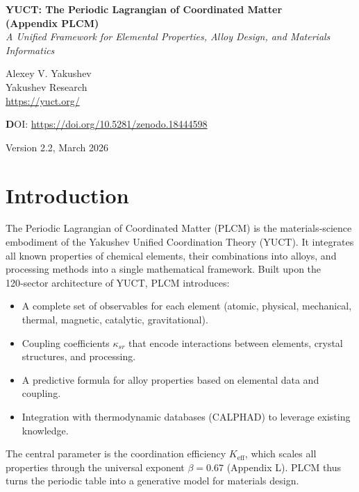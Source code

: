\documentclass[12pt,a4paper]{article}
\newcommand{\Keff}{K_{\mathrm{eff}}}
\newcommand{\be}{\beta}
\begin{document}
	
	\begin{titlepage}
		\centering
		\vspace*{1cm}
		\Huge\textbf{YUCT: The Periodic Lagrangian of Coordinated Matter} \\
		\vspace{0.3cm}
		\Large\textbf{(Appendix PLCM)} \\
		\vspace{0.5cm}
		\large\textit{A Unified Framework for Elemental Properties, Alloy Design, and Materials Informatics}
		\vspace{2cm}
		
		\Large Alexey V. Yakushev \\
		\large Yakushev Research \\
		\url{https://yuct.org/}
		\vspace{2cm}
		
		\vspace{2cm}
		\textbf DOI: \url{https://doi.org/10.5281/zenodo.18444598}\\
		
		\vspace{1cm}
		
		\large Version 2.2, March 2026
		\vfill
	\end{titlepage}
	
	\tableofcontents
	\newpage
	
	\section{Introduction}
	
	The Periodic Lagrangian of Coordinated Matter (PLCM) is the materials‑science embodiment of the Yakushev Unified Coordination Theory (YUCT). It integrates all known properties of chemical elements, their combinations into alloys, and processing methods into a single mathematical framework. Built upon the 120‑sector architecture of YUCT, PLCM introduces:
	\begin{itemize}
		\item A complete set of observables for each element (atomic, physical, mechanical, thermal, magnetic, catalytic, gravitational).
		\item Coupling coefficients \(\kappa_{sr}\) that encode interactions between elements, crystal structures, and processing.
		\item A predictive formula for alloy properties based on elemental data and coupling.
		\item Integration with thermodynamic databases (CALPHAD) to leverage existing knowledge.
	\end{itemize}
	The central parameter is the coordination efficiency \(\Keff\), which scales all properties through the universal exponent \(\be = 0.67\) (Appendix L). PLCM thus turns the periodic table into a generative model for materials design.
	
\end{document}
